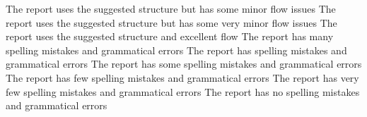 \documentclass{../fal_assignment}
\begin{document}
\begin{markingrubric}
        \grade The report uses the suggested structure but has some minor flow issues
        \grade The report uses the suggested structure but has some very minor flow issues
        \grade The report uses the suggested structure and excellent flow
%
%
	\grade\fail The report has many spelling mistakes and grammatical errors	
	\grade The report has spelling mistakes and grammatical errors	
	\grade The report has some spelling mistakes and grammatical errors	
	\grade The report has few spelling mistakes and grammatical errors	
	\grade The report has very few spelling mistakes and grammatical errors	
	\grade The report has no spelling mistakes and grammatical errors	
%

\end{markingrubric}
\end{document}
